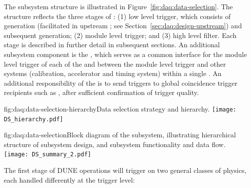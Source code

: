The  subsystem structure is illustrated in
Figure~\ref{fig:daq:data-selection}. The structure
reflects the three stages of : (1) low level trigger, which consists of
 generation (facilitated in upstream ; see
Section~\ref{sec:daq:design-upstream}) and subsequent
 generation; (2) module level trigger; and (3)
high level filter. Each stage is described in further detail in subsequent
sections. An additional subsystem component is the ,
which serves as a common interface for the
module level trigger of each of the   and between
the module level trigger and other systems (calibration,
accelerator and timing system) within a single
. An additional responsibility of the
 is to send  triggers
to global coincidence trigger recipients such as 
\cite{snews}, after sufficient confirmation of trigger quality.

\begin{dunefigure}{fig:daq:data-selection-hierarchy}{Data selection
    strategy and hierarchy.}
  \texttt{[image: DS\_hierarchy.pdf]}
\end{dunefigure}

\begin{dunefigure}{fig:daq:data-selection}{Block diagram of the  
     subsystem, illustrating hierarchical structure of
    subsystem design, and subsystem functionality and data flow.}
  \texttt{[image: DS\_summary\_2.pdf]}
\end{dunefigure}

The first stage of DUNE  operations will trigger on two general
classes of physics, each handled differently at the trigger level:

